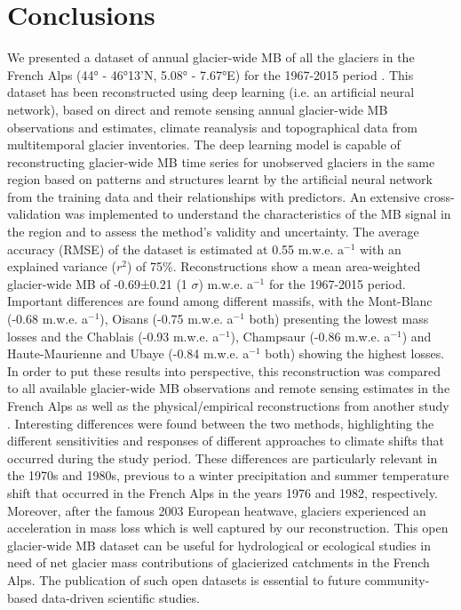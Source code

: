 \section{Conclusions} \label{past:conclusions}

We presented a dataset of annual glacier-wide MB of all the glaciers in the French Alps (44° - 46°13’N, 5.08° - 7.67°E) for the 1967-2015 period \citep{bolibar_deep_2020}. This dataset has been reconstructed using deep learning (i.e. an artificial neural network), based on direct and remote sensing annual glacier-wide MB observations and estimates, climate reanalysis and topographical data from multitemporal glacier inventories. The deep learning model is capable of reconstructing glacier-wide MB time series for unobserved glaciers in the same region based on patterns and structures learnt by the artificial neural network from the training data and their relationships with predictors. An extensive cross-validation was implemented to understand the characteristics of the MB signal in the region and to assess the method’s validity and uncertainty. The average accuracy (RMSE) of the dataset is estimated at 0.55 m.w.e. a$^{-1}$ with an explained variance ($r^{2}$) of 75\%. Reconstructions show a mean area-weighted glacier-wide MB of -0.69±0.21 (1 $\sigma$) m.w.e. a$^{-1}$ for the 1967-2015 period. Important differences are found among different massifs, with the Mont-Blanc (-0.68 m.w.e. a$^{-1}$), Oisans (-0.75 m.w.e. a$^{-1}$ both) presenting the lowest mass losses and the Chablais (-0.93 m.w.e. a$^{-1}$), Champsaur (-0.86 m.w.e. a$^{-1}$) and Haute-Maurienne and Ubaye (-0.84 m.w.e. a$^{-1}$ both) showing the highest losses. In order to put these results into perspective, this reconstruction was compared to all available glacier-wide MB observations and remote sensing estimates in the French Alps as well as the physical/empirical reconstructions from another study \citep[update from][]{marzeion_brief_2015}. Interesting differences were found between the two methods, highlighting the different sensitivities and responses of different approaches to climate shifts that occurred during the study period. These differences are particularly relevant in the 1970s and 1980s, previous to a winter precipitation and summer temperature shift that occurred in the French Alps in the years 1976 and 1982, respectively. Moreover, after the famous 2003 European heatwave, glaciers experienced an acceleration in mass loss which is well captured by our reconstruction. This open glacier-wide MB dataset can be useful for hydrological or ecological studies in need of net glacier mass contributions of glacierized catchments in the French Alps. The publication of such open datasets is essential to future community-based data-driven scientific studies.

